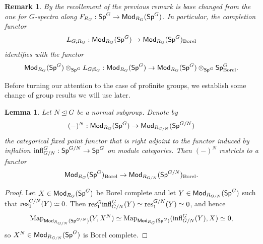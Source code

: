 \documentclass[reqno]{amsart}
\numberwithin{equation}{section}\theoremstyle{thms}
\newtheorem{lem}[equation]{Lemma}
\theoremstyle{defn}
\newtheorem{rem}[equation]{Remark}
\newcommand{\bS}{\mathbb{S}}
\newcommand{\tn}[1]{\textnormal{#1}}
\newcommand{\tsf}[1]{\textsf{\textup{#1}}}
\newcommand{\Map}{\tn{Map}}
\newcommand{\Mod}{\tsf{Mod}}
\newcommand{\spec}{\tsf{Sp}}
\newcommand{\specg}{\tsf{Sp}^G}
\begin{document}
\begin{rem}
By \cite[Proposition 4.14]{npr24} the recollement of the previous remark is base changed from the one for $G$-spectra along $F_{R_G}: \specg \to \Mod_{R_G}(\specg)$. In particular, the completion functor 
$$L_{G;R_G}: \Mod_{R_G}(\spec^{G}) \to \Mod_{R_G}(\specg)_{\tn{Borel}}$$ 
identifies with the functor
$$\Mod_{R_G}(\spec^{G}) \otimes_{\specg} L_{G;\bS_G}: \Mod_{R_G}(\spec^{G}) \to \Mod_{R_G}(\spec^{G}) \otimes_{\specg} \specg_{\tn{Borel}}.$$
\end{rem}

Before turning our attention to the case of profinite groups, we establish some change of group results we will use later.

\begin{lem}\label{lem:categoricalfixedpointsborelcomplete}
Let $N \unlhd G$ be a normal subgroup. Denote by 
$$(-)^N:\Mod_{R_G}(\specg) \to \Mod_{R_{G/N}}(\spec^{G/N})$$ 
the categorical fixed point functor that is right adjoint to the functor induced by inflation $\tn{infl}^G_{G/N}: \spec^{G/N} \to \specg$ on module categories. Then $(-)^N$ restricts to a functor 
$$\Mod_{R_G}(\specg)_{\tn{Borel}} \to \Mod_{R_{G/N}}(\spec^{G/N})_{\tn{Borel}}.$$
\end{lem}
\begin{proof}
Let $X \in \Mod_{R_G}(\specg)$ be Borel complete and let $Y \in \Mod_{R_{G/N}}(\specg)$ such that $\tn{res}^{G/N}_1(Y) \simeq 0$. Then $\tn{res}^G_1\tn{infl}^G_{G/N}(Y) \simeq \tn{res}^{G/N}_1(Y) \simeq 0$, and hence
$$\Map_{\Mod_{R_{G/N}}(\spec^{G/N})}(Y,X^N) \simeq \Map_{\Mod_{R_{G}}(\specg)}(\tn{infl}^G_{G/N}(Y),X) \simeq 0,$$
so $X^N \in \Mod_{R_{G/N}}(\specg)$ is Borel complete.
\end{proof}
\end{document}
